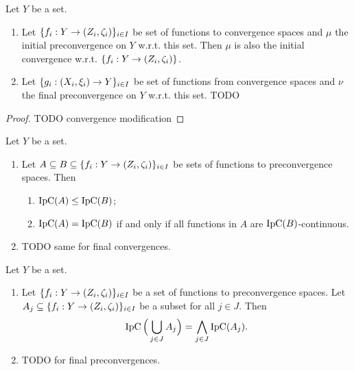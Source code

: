 \begin{proposition} \label{initialFinalConvergenceModification}
Let $Y$ be a set.
\begin{enumerate}
\item Let $\{f_i: Y\to \sSet{Z_i, \zeta_i}\}_{i\in I}$ be set of functions to convergence spaces and $\mu$ the initial preconvergence on $Y$ w.r.t. this set. Then $\mu$ is also the initial convergence w.r.t. $\{f_i: Y\to \sSet{Z_i, \zeta_i}\}$.
\item Let $\{g_i: \sSet{X_i, \xi_i} \to Y\}_{i\in I}$ be set of functions from convergence spaces and $\nu$ the final preconvergence on $Y$ w.r.t. this set. TODO
\end{enumerate}
\end{proposition}
\begin{proof}
TODO convergence modification
\end{proof}

\begin{lemma} \label{initialFinalConvergencesSubsetFunctions}
Let $Y$ be a set.
\begin{enumerate}
\item Let $A\subseteq B\subseteq \{f_i: Y\to \sSet{Z_i, \zeta_i}\}_{i\in I}$ be sets of functions to preconvergence spaces. Then
\begin{enumerate}
\item $\operatorname{IpC}(A) \leq \operatorname{IpC}(B)$;
\item $\operatorname{IpC}(A) = \operatorname{IpC}(B)$ \textup{if and only if} all functions in $A$ are $\operatorname{IpC}(B)$-continuous.
\end{enumerate}
\item TODO same for final convergences.
\end{enumerate}
\end{lemma}

\begin{lemma} \label{initialFinalPreconvergenceUnion}
Let $Y$ be a set.
\begin{enumerate}
\item Let $\{f_i: Y\to \sSet{Z_i, \zeta_i}\}_{i\in I}$ be a set of functions to preconvergence spaces. Let $A_j \subseteq \{f_i: Y\to \sSet{Z_i, \zeta_i}\}_{i\in I}$ be a subset for all $j\in J$. Then
\[ \operatorname{IpC}\Big(\bigcup_{j\in J}A_j\Big) = \bigwedge_{j\in J}\operatorname{IpC}(A_j). \]
\item TODO for final preconvergences.
\end{enumerate}
\end{lemma}

